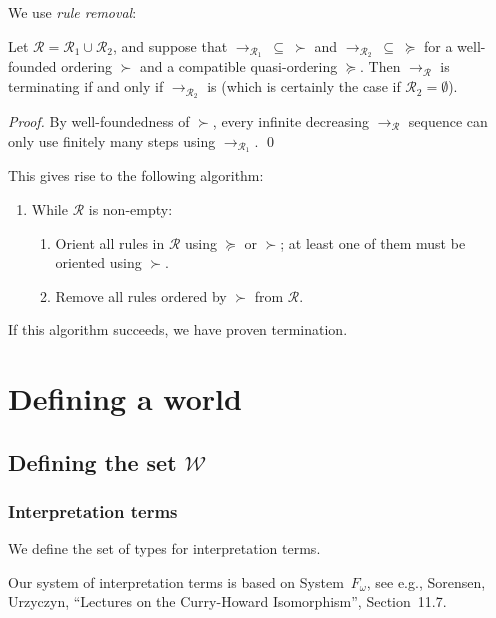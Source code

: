 \documentclass[runningheads,a4paper]{llncs}
\newcommand{\World}{\mathcal{W}}
\newcommand{\Rules}{\mathcal{R}}
\newcommand{\arr}[1]{\longrightarrow_{#1}}
\begin{document}
\renewcommand{\theenumii}{\alph{enumii}}

We use \emph{rule removal}:

\begin{theorem}\label{thm:ruleremove}
Let $\Rules = \Rules_1 \cup \Rules_2$, and suppose that $\arr{\Rules_1}\:
\subseteq\:\succ$ and $\arr{\Rules_2}\:\subseteq\:\succeq$ for a
well-founded ordering $\succ$ and a compatible quasi-ordering $\succeq$.
Then $\arr{\Rules}$ is terminating if and only if $\arr{\Rules_2}$ is
(which is certainly the case if $\Rules_2 = \emptyset$).
\end{theorem}

\begin{proof}
By well-foundedness of $\succ$, every infinite decreasing $\arr{\Rules}$
sequence can only use finitely many steps using $\arr{\Rules_1}$.
\qed
\end{proof}

This gives rise to the following algorithm:
\begin{enumerate}
\item While $\Rules$ is non-empty:
  \begin{enumerate}
  \item Orient all rules in $\Rules$ using $\succeq$ or $\succ$; at least
    one of them must be oriented using $\succ$.
  \item Remove all rules ordered by $\succ$ from $\Rules$.
  \end{enumerate}
\end{enumerate}
If this algorithm succeeds, we have proven termination.

\section{Defining a world}

\subsection{Defining the set $\World$}

\subsubsection{Interpretation terms}
We define the set of types for interpretation terms.

Our system of interpretation terms is based on System~$F_\omega$, see
e.g., Sorensen, Urzyczyn, ``Lectures on the Curry-Howard
Isomorphism'', Section~11.7.
\end{document}
